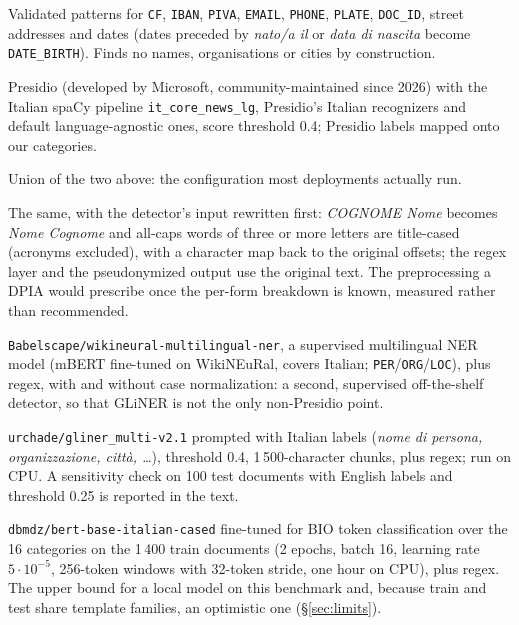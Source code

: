 \documentclass[11pt,a4paper]{article}
\newcommand{\pseud}[1]{\texttt{#1}}
\begin{document}
\begin{description}[nosep]
\item[regex] Validated patterns for \pseud{CF}, \pseud{IBAN}, \pseud{PIVA}, \pseud{EMAIL}, \pseud{PHONE}, \pseud{PLATE}, \pseud{DOC\_ID}, street addresses and dates (dates preceded by \emph{nato/a il} or \emph{data di nascita} become \pseud{DATE\_BIRTH}). Finds no names, organisations or cities by construction.
\item[Presidio] Presidio \citep{presidio} (developed by Microsoft, community-maintained since 2026) with the Italian spaCy pipeline \pseud{it\_core\_news\_lg}, Presidio's Italian recognizers and default language-agnostic ones, score threshold 0.4; Presidio labels mapped onto our categories.
\item[Presidio + regex] Union of the two above: the configuration most deployments actually run.
\item[Presidio + case normalization + regex] The same, with the detector's input rewritten first: \emph{COGNOME Nome} becomes \emph{Nome Cognome} and all-caps words of three or more letters are title-cased (acronyms excluded), with a character map back to the original offsets; the regex layer and the pseudonymized output use the original text. The preprocessing a DPIA would prescribe once the per-form breakdown is known, measured rather than recommended.
\item[WikiNEuRal + regex] \pseud{Babelscape/wikineural-multilingual-ner}, a supervised multilingual NER model (mBERT fine-tuned on WikiNEuRal, covers Italian; \pseud{PER}/\pseud{ORG}/\pseud{LOC}), plus regex, with and without case normalization: a second, supervised off-the-shelf detector, so that GLiNER is not the only non-Presidio point.
\item[GLiNER + regex] \pseud{urchade/gliner\_multi-v2.1} \citep{zaratiana2024gliner} prompted with Italian labels (\emph{nome di persona, organizzazione, città, \ldots}), threshold 0.4, 1\,500-character chunks, plus regex; run on CPU. A sensitivity check on 100 test documents with English labels and threshold 0.25 is reported in the text.
\item[fine-tuned] \pseud{dbmdz/bert-base-italian-cased} fine-tuned for BIO token classification over the 16 categories on the 1\,400 train documents (2 epochs, batch 16, learning rate $5\cdot10^{-5}$, 256-token windows with 32-token stride, one hour on CPU), plus regex. The upper bound for a local model on this benchmark and, because train and test share template families, an optimistic one (\S\ref{sec:limits}).

\end{description}
\end{document}
